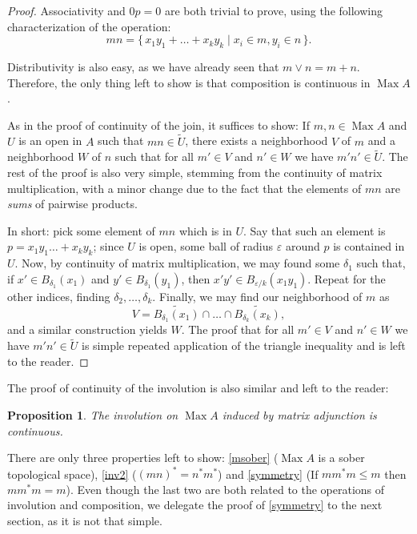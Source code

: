 \documentclass{article}
\theoremstyle{plain}
\newtheorem{prop}{Proposition}
\theoremstyle{nonumberplain}
\newtheorem{proof}{Proof}
\DeclareMathOperator{\Max}{Max}
\begin{document}
\begin{proof}
Associativity and $0p = 0$ are both trivial to prove, using the following characterization of the operation:
\[mn = \{\, x_1 y_1 + \dots + x_k y_k \mid x_i \in m, y_i \in n \,\}.\]

Distributivity is also easy, as we have already seen that $m \lor n = m + n$. Therefore, the only thing left to show is that composition is continuous in $\Max A$.

As in the proof of continuity of the join, it suffices to show: If $m,n \in \Max A$ and $U$ is an open in $A$ such that $mn \in \tilde U$, there exists a neighborhood $V$ of $m$ and a neighborhood $W$ of $n$ such that for all $m' \in V$ and $n' \in W$ we have $m'n' \in \tilde U$. The rest of the proof is also very simple, stemming from the continuity of matrix multiplication, with a minor change due to the fact that the elements of $mn$ are \emph{sums} of pairwise products.

In short: pick some element of $mn$ which is in $U$. Say that such an element is $p = x_1 y_1 \dots + x_k y_k$; since $U$ is open, some ball of radius $\varepsilon$ around $p$ is contained in $U$. Now, by continuity of matrix multiplication, we may found some $\delta_1$ such that, if $x' \in B_{\delta_1}(x_1)$ and $y' \in B_{\delta_1}(y_1)$, then $x' y' \in B_{\varepsilon/k} (x_1 y_1)$. Repeat for the other indices, finding $\delta_2, \dots, \delta_k$. Finally, we may find our neighborhood of $m$ as
\[V = \widetilde{B_{\delta_1}(x_1)} \cap \dots \cap \widetilde{B_{\delta_k}(x_k)},\]
and a similar construction yields $W$. The proof that for all $m' \in V$ and $n' \in W$ we have $m' n' \in \tilde U$ is simple repeated application of the triangle inequality and is left to the reader.
\end{proof}

The proof of continuity of the involution is also similar and left to the reader:

\begin{prop}
The involution on $\Max A$ induced by matrix adjunction is continuous.
\end{prop}

There are only three properties left to show: \ref{msober} ($\Max A$ is a sober topological space), \ref{inv2} ($(mn)^* = n^* m^*$) and \ref{symmetry} (If $m m^* m \leq m$ then $m m^* m = m$). Even though the last two are both related to the operations of involution and composition, we delegate the proof of \ref{symmetry} to the next section, as it is not that simple.
\end{document}
